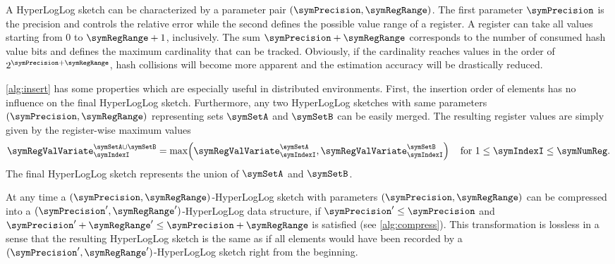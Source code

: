 \documentclass[a4paper]{scrartcl}
\begin{document}
A HyperLogLog sketch can be characterized by a parameter pair $(\symPrecision, \symRegRange)$. The first parameter $\symPrecision$ is the precision and controls the relative error while the second defines the possible value range of a register. A register can take all values starting from 0 to $\symRegRange+1$, inclusively. The sum $\symPrecision+\symRegRange$ corresponds to the number of consumed hash value bits and defines the maximum cardinality that can be tracked. Obviously, if the cardinality reaches values in the order of $2^{\symPrecision+\symRegRange}$, hash collisions will become more apparent and the estimation accuracy will be drastically reduced.

\cref{alg:insert} has some properties which are especially useful in distributed environments. First, the insertion order of elements has no influence on the final HyperLogLog sketch. Furthermore, any two HyperLogLog sketches with same parameters $(\symPrecision, \symRegRange)$ representing  sets $\symSetA$ and $\symSetB$ can be easily merged. The resulting register values are simply given by the register-wise maximum values
\begin{equation}
\label{equ:hll_union}
\symRegValVariate^{\symSetA\cup\symSetB}_{\symIndexI} = 
\max
\!
\left(
\symRegValVariate^{\symSetA}_{\symIndexI},
\symRegValVariate^{\symSetB}_{\symIndexI}
\right)
\quad
\text{for $1\leq\symIndexI\leq\symNumReg$}.
\end{equation}
The final HyperLogLog sketch represents the union of $\symSetA$ and $\symSetB$.

At any time a $(\symPrecision, \symRegRange)$-HyperLogLog sketch with parameters $(\symPrecision, \symRegRange)$ can be compressed into a $(\symPrecision', \symRegRange')$-HyperLogLog data structure, if $\symPrecision'\leq\symPrecision$ and $\symPrecision'+\symRegRange' \leq\symPrecision + \symRegRange$ is satisfied (see \cref{alg:compress}). This transformation is lossless in a sense that the resulting HyperLogLog sketch is the same as if all elements would have been recorded by a $(\symPrecision', \symRegRange')$-HyperLogLog sketch right from the beginning.
\end{document}
